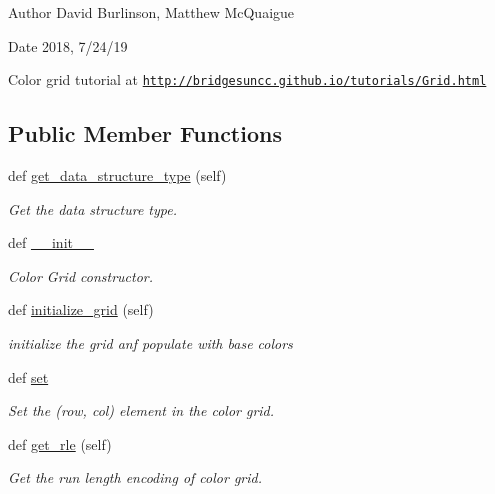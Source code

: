 \begin{DoxyAuthor}{Author}
David Burlinson, Matthew Mc\+Quaigue
\end{DoxyAuthor}
\begin{DoxyDate}{Date}
2018, 7/24/19
\end{DoxyDate}
Color grid tutorial at \href{http://bridgesuncc.github.io/tutorials/Grid.html}{\tt http\+://bridgesuncc.\+github.\+io/tutorials/\+Grid.\+html} \subsection*{Public Member Functions}
\begin{DoxyCompactItemize}
\item 
def \mbox{\hyperlink{classbridges_1_1color__grid_1_1_color_grid_a4dbf23124fdc8edae222c100cf7b9363}{get\+\_\+data\+\_\+structure\+\_\+type}} (self)
\begin{DoxyCompactList}\small\item\em Get the data structure type. \end{DoxyCompactList}\item 
def \mbox{\hyperlink{classbridges_1_1color__grid_1_1_color_grid_aa4b484e518b5fc0c970ea36e8500dbe5}{\+\_\+\+\_\+init\+\_\+\+\_\+}}
\begin{DoxyCompactList}\small\item\em Color Grid constructor. \end{DoxyCompactList}\item 
def \mbox{\hyperlink{classbridges_1_1color__grid_1_1_color_grid_ad2b3ab19751cbf629096a25e31bb7f42}{initialize\+\_\+grid}} (self)
\begin{DoxyCompactList}\small\item\em initialize the grid anf populate with base colors \end{DoxyCompactList}\item 
def \mbox{\hyperlink{classbridges_1_1color__grid_1_1_color_grid_a746dde66b828253bd0dfb32c906729fe}{set}}
\begin{DoxyCompactList}\small\item\em Set the (row, col) element in the color grid. \end{DoxyCompactList}\item 
def \mbox{\hyperlink{classbridges_1_1color__grid_1_1_color_grid_a48ded4391e60e4f42213fb3711730614}{get\+\_\+rle}} (self)
\begin{DoxyCompactList}\small\item\em Get the run length encoding of color grid. \end{DoxyCompactList}\item 

\end{DoxyCompactItemize}
